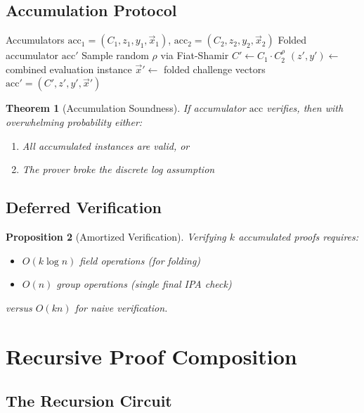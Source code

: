 \documentclass[11pt,a4paper]{article}
\newtheorem{theorem}{Theorem}[section]
\newtheorem{proposition}[theorem]{Proposition}
\begin{document}
\subsection{Accumulation Protocol}

\begin{algorithm}
\caption{Accumulator Folding}
\label{alg:fold}
\begin{algorithmic}[1]
\Require Accumulators $\text{acc}_1 = (C_1, z_1, y_1, \vec{x}_1)$, $\text{acc}_2 = (C_2, z_2, y_2, \vec{x}_2)$
\Ensure Folded accumulator $\text{acc}'$
\State Sample random $\rho$ via Fiat-Shamir
\State $C' \gets C_1 \cdot C_2^\rho$
\State $(z', y') \gets $ combined evaluation instance
\State $\vec{x}' \gets $ folded challenge vectors
\State \Return $\text{acc}' = (C', z', y', \vec{x}')$
\end{algorithmic}
\end{algorithm}

\begin{theorem}[Accumulation Soundness]
If accumulator $\text{acc}$ verifies, then with overwhelming probability either:
\begin{enumerate}[label=(\roman*)]
    \item All accumulated instances are valid, or
    \item The prover broke the discrete log assumption
\end{enumerate}
\end{theorem}

\subsection{Deferred Verification}

\begin{proposition}[Amortized Verification]
Verifying $k$ accumulated proofs requires:
\begin{itemize}
    \item $O(k \log n)$ field operations (for folding)
    \item $O(n)$ group operations (single final IPA check)
\end{itemize}
versus $O(kn)$ for naive verification.
\end{proposition}

\section{Recursive Proof Composition}
\label{sec:recursion}

\subsection{The Recursion Circuit}
\end{document}
